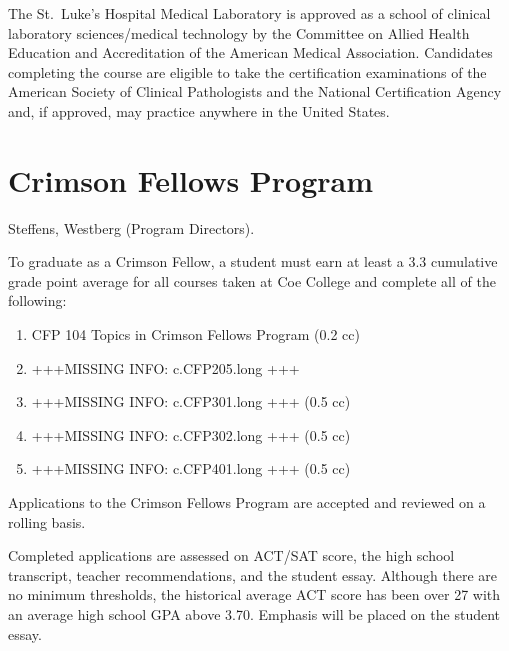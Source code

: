 \documentclass[
  letterpaper,
]{scrbook}
\providecommand{\tightlist}{%
  \setlength{\itemsep}{0pt}\setlength{\parskip}{0pt}}
\begin{document}
The St.~Luke's Hospital Medical Laboratory is approved as a school of
clinical laboratory sciences/medical technology by the Committee on
Allied Health Education and Accreditation of the American Medical
Association. Candidates completing the course are eligible to take the
certification examinations of the American Society of Clinical
Pathologists and the National Certification Agency and, if approved, may
practice anywhere in the United States.

\section{Crimson Fellows Program}\label{crimson-fellows-program}

Steffens, Westberg (Program Directors).

To graduate as a Crimson Fellow, a student must earn at least a 3.3
cumulative grade point average for all courses taken at Coe College and
complete all of the following:

\begin{enumerate}
\def\labelenumi{\arabic{enumi}.}
\tightlist
\item
  CFP 104 Topics in Crimson Fellows Program (0.2 cc)
\item
  +++MISSING INFO: c.CFP205.long +++
\item
  +++MISSING INFO: c.CFP301.long +++ (0.5 cc)
\item
  +++MISSING INFO: c.CFP302.long +++ (0.5 cc)
\item
  +++MISSING INFO: c.CFP401.long +++ (0.5 cc)
\end{enumerate}

Applications to the Crimson Fellows Program are accepted and reviewed on
a rolling basis.

Completed applications are assessed on ACT/SAT score, the high school
transcript, teacher recommendations, and the student essay. Although
there are no minimum thresholds, the historical average ACT score has
been over 27 with an average high school GPA above 3.70. Emphasis will
be placed on the student essay.
\end{document}
